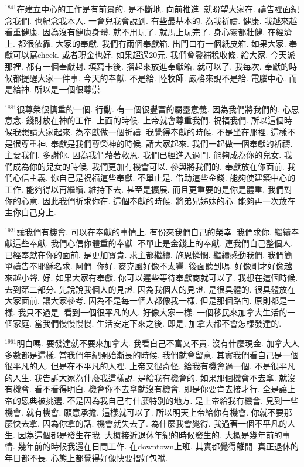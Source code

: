 \documentclass{book}
\begin{document}
$^{1841}$在建立中心的工作是有前景的.
是不斷地.
向前推進.
就盼望大家在.
禱告裡面紀念我們.
也紀念我本人.
一會兒我會說到.
有些最基本的.
為我祈禱.
健康.
我越來越看重健康.
因為沒有健康身體.
就不用玩了.
就馬上玩完了.
身心靈都壯健.
在經濟上.
都很依靠.
大家的奉獻.
我們有兩個奉獻箱.
出門口有一個紙皮箱.
如果大家.
奉獻可以寫check.
或者現金也好.
如果超過20元.
我們會發補稅收條.
給大家.
今天派那裡.
都有一個奉獻封.
填寫卡後.
摺起來放進奉獻箱.
就可以了.
我每次.
奉獻的時候都提醒大家一件事.
今天的奉獻.
不是給.
陸牧師.
嚴格來說不是給.
電腦中心.
而是給神.
所以是一個很尊崇.

$^{1881}$很尊榮很慎重的一個.
行動.
有一個很豐富的屬靈意義.
因為我們將我們的.
心思意念.
錢財放在神的工作.
上面的時候.
上帝就會尊重我們.
祝福我們.
所以這個時候我想請大家起來.
為奉獻做一個祈禱.
我覺得奉獻的時候.
不是坐在那裡.
這樣不是很尊重神.
奉獻是我們尊榮神的時候.
請大家起來.
我們一起做一個奉獻的祈禱.
主要我們.
多謝你.
因為我們藉著救恩.
我們已經進入過門.
能夠成為你的兒女.
我們成為你的兒女的時候.
我們更加有機會可以.
參與將我們的.
奉獻放在你面前.
我們心信主義.
你自己是祝福這些奉獻.
不單止是.
借助這些金錢.
能夠使建築中心的工作.
能夠得以再繼續.
維持下去.
甚至是擴展.
而且更重要的是你是體重.
我們對你的心意.
因此我們祈求你在.
這個奉獻的時候.
將弟兄姊妹的心.
能夠再一次放在主你自己身上.

$^{1921}$讓我們有機會.
可以在奉獻的事情上.
有份來我們自己的榮幸.
我們求你.
繼續奉獻這些奉獻.
我們心信你體重的奉獻.
不單止是金錢上的奉獻.
連我們自己整個人.
已經奉獻在你的面前.
是更加寶貴.
求主都繼續.
施恩憐憫.
繼續感動我們.
我們簡單禱告奉耶穌名求.
阿們.
你好.
麥克風好像不太響.
後面聽到嗎.
好像剛才好像越來越小聲.
好.
如果大家有奉獻.
你可以遲些等待奉獻商就可以了.
我想在這個時候.
去到第二部分.
先說說我個人的見證.
因為我個人的見證.
是很具體的.
很具體放在大家面前.
讓大家參考.
因為不是每一個人都像我一樣.
但是那個路向.
原則都是一樣.
我只不過是.
看到一個很平凡的人.
好像大家一樣.
一個移民來加拿大生活的一個家庭.
當我們慢慢慢慢.
生活安定下來之後.
即是.
加拿大都不會怎樣發達的.

$^{1961}$明白嗎.
要發達就不要來加拿大.
我看自己不富又不貴.
沒有什麼現金.
加拿大人多數都是這樣.
當我們年紀開始漸長的時候.
我們就會留意.
其實我們看自己是一個很平凡的人.
但是在不平凡的人裡.
上帝又很奇怪.
給我有機會過一個.
不是很平凡的人生.
我告訴大家為什麼我這樣說.
是給我有機會的.
如果那個機會不去拿.
就沒有機會.
看不看得明白.
機會你不去拿就沒有機會.
即是你要肯去接才行.
全是讓上帝的恩典被挑選.
不是因為我自己有什麼特別的地方.
是上帝給我有機會.
見到一些機會.
就有機會.
願意承擔.
這樣就可以了.
所以明天上帝給你有機會.
你就不要那麼快去拿.
因為你拿的話.
機會就失去了.
為什麼我會覺得.
我過著一個不平凡的人生.
因為這個都是發生在我.
大概接近退休年紀的時候發生的.
大概是幾年前的事情.
幾年前的時候我還在日間工作.
在downtown上班.
其實都覺得離開.
真正退休的年日都不長.
心態上都覺得好像快要摺好包袱.
\end{document}
